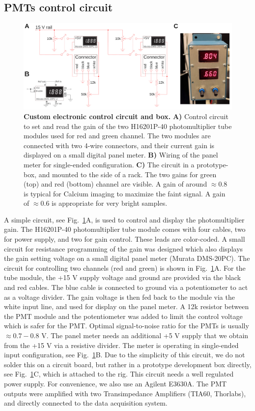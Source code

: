 \documentclass[10pt,letterpaper]{article}
\begin{document}
\subsection*{PMTs control circuit}
%
\begin{figure}[!t]
    \includegraphics[width=\textwidth]{fig4.jpg}
    \caption{{\bf Custom electronic control circuit and box.} \textbf{A)} Control circuit to set and read the gain of the two H16201P-40 photomultiplier tube modules used for red and green channel. The two modules are connected with two 4-wire connectors, and their current gain is displayed on a small digital panel meter. \textbf{B)} Wiring of the panel meter for single-ended configuration. \textbf{C)} The circuit in a prototype-box, and mounted to the side of a rack. The two gains for green (top) and red (bottom) channel are visible. A gain of around $\approx0.8$ is typical for Calcium imaging to maximize the faint signal. A gain of $\approx0.6$ is appropriate for very bright samples.}
    \label{fig4}
\end{figure}
%
A simple circuit, see Fig.~\ref{fig4}A, is used to control and display the photomultiplier gain. The H16201P-40 photomultiplier tube module comes with four cables, two for power supply, and two for gain control. These leads are color-coded. A small circuit for resistance programming of the gain was designed which also displays the gain setting voltage on a small digital panel meter (Murata DMS-20PC). The circuit for controlling two channels (red and green) is shown in Fig.~\ref{fig4}A. For the tube module, the +15 V supply voltage and ground are provided via the black and red cables. The blue cable is connected to ground via a potentiometer to act as a voltage divider. The gain voltage is then fed back to the module via the white input line, and used for display on the panel meter. A 12k resistor between the PMT module and the potentiometer was added to limit the control voltage which is safer for the PMT. Optimal signal-to-noise ratio for the PMTs is usually $\approx 0.7-0.8\text{ V}$. The panel meter needs an additional +5 V supply that we obtain from the +15 V via a resistive divider. The meter is operating in single-ended input conﬁguration, see Fig.~\ref{fig4}B. Due to the simplicity of this circuit, we do not solder this on a circuit board, but rather in a prototype development box directly, see Fig.~\ref{fig4}C, which is attached to the rig. This circuit needs a well regulated power supply. For convenience, we also use an Agilent E3630A. The PMT outputs were amplified with two Transimpedance Amplifiers (TIA60, Thorlabs), and directly connected to the data acquisition system.
\end{document}
